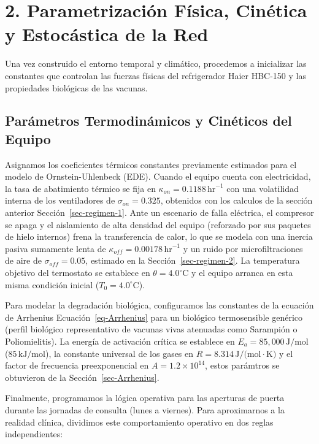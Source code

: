 \documentclass[
  spanish,
  letterpaper,
  DIV=11,
  numbers=noendperiod]{scrreprt}
\theoremstyle{plain}
\theoremstyle{definition}
\theoremstyle{remark}
\begin{document}
\section{2. Parametrización Física, Cinética y Estocástica de la
Red}\label{parametrizaciuxf3n-fuxedsica-cinuxe9tica-y-estocuxe1stica-de-la-red}

Una vez construido el entorno temporal y climático, procedemos a
inicializar las constantes que controlan las fuerzas físicas del
refrigerador Haier HBC-150 y las propiedades biológicas de las vacunas.

\subsection{Parámetros Termodinámicos y Cinéticos del
Equipo}\label{paruxe1metros-termodinuxe1micos-y-cinuxe9ticos-del-equipo}

Asignamos los coeficientes térmicos constantes previamente estimados
para el modelo de Ornstein-Uhlenbeck (EDE). Cuando el equipo cuenta con
electricidad, la tasa de abatimiento térmico se fija en
\(\kappa_{on} = 0.1188\,\text{hr}^{-1}\) con una volatilidad interna de
los ventiladores de \(\sigma_{on} = 0.325\), obtenidos con los calculos
de la sección anterior Sección~\ref{sec-regimen-1}. Ante un escenario de
falla eléctrica, el compresor se apaga y el aislamiento de alta densidad
del equipo (reforzado por sus paquetes de hielo internos) frena la
transferencia de calor, lo que se modela con una inercia pasiva
sumamente lenta de \(\kappa_{off} = 0.00178\,\text{hr}^{-1}\) y un ruido
por microfiltraciones de aire de \(\sigma_{off} = 0.05\), estimado en la
Sección~\ref{sec-regimen-2}. La temperatura objetivo del termostato se
establece en \(\theta = 4.0^\circ\text{C}\) y el equipo arranca en esta
misma condición inicial (\(T_0 = 4.0^\circ\text{C}\)).

Para modelar la degradación biológica, configuramos las constantes de la
ecuación de Arrhenius Ecuación~\ref{eq-Arrhenius} para un biológico
termosensible genérico (perfil biológico representativo de vacunas vivas
atenuadas como Sarampión o Poliomielitis). La energía de activación
crítica se establece en \(E_a = 85,000\,\text{J/mol}\)
(\(85\,\text{kJ/mol}\)), la constante universal de los gases en
\(R = 8.314\,\text{J/(mol}\cdot\text{K)}\) y el factor de frecuencia
preexponencial en \(A = 1.2 \times 10^{14}\), estos parámtros se
obtuvieron de la Sección~\ref{sec-Arrhenius}.

Finalmente, programamos la lógica operativa para las aperturas de puerta
durante las jornadas de consulta (lunes a viernes). Para aproximarnos a
la realidad clínica, dividimos este comportamiento operativo en dos
reglas independientes:
\end{document}
